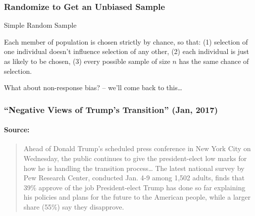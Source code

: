 \begin{frame}
\frametitle{Randomize to Get an Unbiased Sample}

\begin{block}{Simple Random Sample}

Each member of population is chosen strictly by chance, so that: (1) selection of one individual doesn't influence selection of any other, (2) each individual is just as likely to be chosen, (3) every possible sample of size $n$ has the same chance of selection.

\end{block}

\begin{block}{What about non-response bias? -- we'll come back to this\dots}
\end{block}
\end{frame}
\begin{frame}
  \frametitle{``Negative Views of Trump's Transition'' (Jan, 2017)}
  \framesubtitle{Source: \href{http://www.people-press.org/2017/01/10/negative-views-of-trumps-transition-amid-concerns-about-conflicts-tax-returns/}{}}
  \begin{quote}
Ahead of Donald Trump's scheduled press conference in New York City on Wednesday, the public continues to give the president-elect low marks for how he is handling the transition process\dots 
The latest national survey by Pew Research Center, conducted Jan. 4-9 among 1,502 adults, finds that 39\% approve of the job President-elect Trump has done so far explaining his policies and plans for the future to the American people, while a larger share (55\%) say they disapprove.
  \end{quote}
\end{frame}
%
